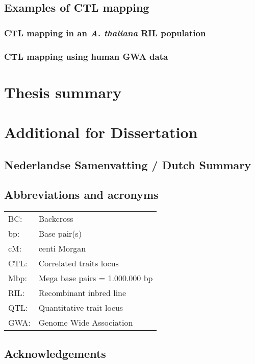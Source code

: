 \documentclass[8pt, twoside, a5paper]{report}
\begin{document}
\section{Examples of CTL mapping}
\lipsum
\subsection{CTL mapping in an \emph{A. thaliana} RIL population}

\subsection{CTL mapping using human GWA data}

\chapter{Thesis summary}
\lipsum[1-3]

\chapter{Additional for Dissertation}
\section*{Nederlandse Samenvatting / Dutch Summary}
\lipsum[1]

\section*{Abbreviations and acronyms}
\begin{tabular}{ l l }
BC:          & Backcross \\
bp:          & Base pair(s) \\
cM:          & centi Morgan \\
CTL:         & Correlated traits locus \\
Mbp:         & Mega base pairs = 1.000.000 bp \\
RIL:         & Recombinant inbred line \\
QTL:         & Quantitative trait locus \\
GWA:         & Genome Wide Association \\
\end{tabular}

\newpage

\section*{Acknowledgements}
\lipsum[1]
\end{document}
